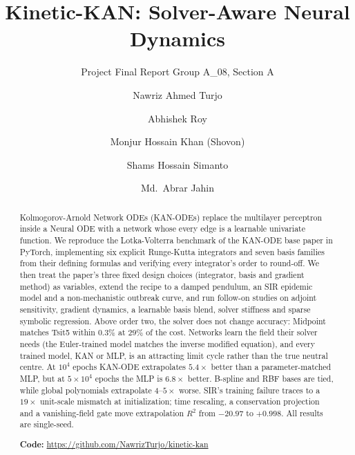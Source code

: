\documentclass[sigconf,nonacm]{acmart}
\begin{document}
\title{Kinetic-KAN: Solver-Aware Neural Dynamics}
\subtitle{Project Final Report \textperiodcentered{} Group A\_08, Section A}

\author{Nawriz Ahmed Turjo}

\author{Abhishek Roy}

\author{Monjur Hossain Khan (Shovon)}

\author{Shams Hossain Simanto}

\author{Md.\ Abrar Jahin}

\renewcommand{\shortauthors}{Group A\_08}

\begin{abstract}
Kolmogorov-Arnold Network ODEs (KAN-ODEs) replace the multilayer perceptron
inside a Neural ODE with a network whose every edge is a learnable univariate
function. We reproduce the Lotka-Volterra benchmark of the KAN-ODE base paper
in PyTorch, implementing six explicit Runge-Kutta integrators and seven basis
families from their defining formulas and verifying every integrator's order
to round-off. We then treat the paper's three fixed design choices
(integrator, basis and gradient method) as variables, extend the recipe to a
damped pendulum, an SIR epidemic model and a non-mechanistic outbreak curve, and run
follow-on studies on adjoint sensitivity, gradient dynamics, a learnable
basis blend, solver stiffness and sparse symbolic regression. Above order
two, the solver does not change accuracy: Midpoint matches Tsit5 within
$0.3\%$ at $29\%$ of the cost. Networks learn the field their solver needs
(the Euler-trained model matches the inverse modified equation), and every
trained model, KAN or MLP, is an attracting limit cycle rather than the true
neutral centre. At $10^4$ epochs KAN-ODE extrapolates $5.4\times$ better
than a parameter-matched MLP, but at $5\times10^4$ epochs the MLP is
$6.8\times$ better. B-spline and RBF bases are tied, while global polynomials
extrapolate $4$--$5\times$ worse. SIR's training failure traces to a
$19\times$ unit-scale mismatch at initialization; time rescaling, a
conservation projection and a vanishing-field gate move extrapolation $R^2$
from $-20.97$ to $+0.998$. All results are single-seed.

\smallskip\noindent\textbf{Code:} \url{https://github.com/NawrizTurjo/kinetic-kan}
\end{abstract}
\end{document}
